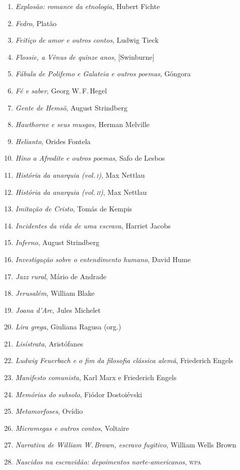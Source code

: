 \begin{enumerate}
\item \textit{Explosão: romance da etnologia}, Hubert Fichte
\item \textit{Fedro}, Platão
\item \textit{Feitiço de amor e outros contos}, Ludwig Tieck
\item \textit{Flossie, a Vênus de quinze anos}, [Swinburne]
\item \textit{Fábula de Polifemo e Galateia e outros poemas}, Góngora
\item \textit{Fé e saber}, Georg W.\,F.\,Hegel
\item \textit{Gente de Hemsö}, August Strindberg 
\item \textit{Hawthorne e seus musgos}, Herman Melville
\item \textit{Helianto}, Orides Fontela
\item \textit{Hino a Afrodite e outros poemas}, Safo de Lesbos 
\item \textit{História da anarquia (vol.\,\textsc{i})}, Max Nettlau
\item \textit{História da anarquia (vol.\,\textsc{ii})}, Max Nettlau
\item \textit{Imitação de Cristo}, Tomás de Kempis
\item \textit{Incidentes da vida de uma escrava}, Harriet Jacobs
\item \textit{Inferno}, August Strindberg
\item \textit{Investigação sobre o entendimento humano}, David Hume
\item \textit{Jazz rural}, Mário de Andrade
\item \textit{Jerusalém}, William Blake
\item \textit{Joana d'Arc}, Jules Michelet
\item \textit{Lira grega}, Giuliana Ragusa (org.)
\item \textit{Lisístrata}, Aristófanes 
\item \textit{Ludwig Feuerbach e o fim da filosofia clássica alemã}, Friederich Engels
\item \textit{Manifesto comunista}, Karl Marx e Friederich Engels
\item \textit{Memórias do subsolo}, Fiódor Dostoiévski
\item \textit{Metamorfoses}, Ovídio
\item \textit{Micromegas e outros contos}, Voltaire
\item \textit{Narrativa de William W.\,Brown, escravo fugitivo}, William Wells Brown
\item \textit{Nascidos na escravidão: depoimentos norte-americanos}, \textsc{wpa}

\end{enumerate}
